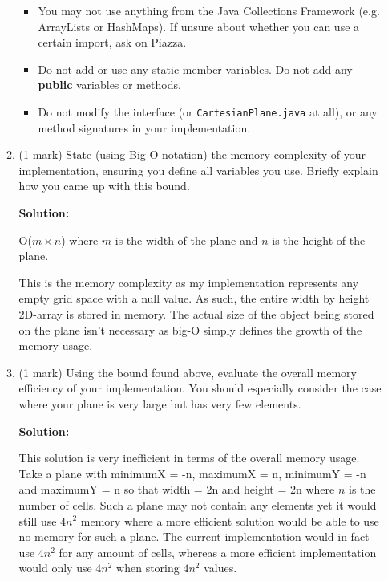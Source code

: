 \documentclass[a4,13pt]{extarticle}
\newenvironment{Solution}{\color{blue}\textbf{Solution:}}{}
\begin{document}
\begin{enumerate}
\begin{enumerate}
\begin{itemize}
	      	      	      	   	                          
	      	      	\item You may not use anything from the Java Collections Framework (e.g. ArrayLists or HashMaps). If unsure about whether you can use a certain import, ask on Piazza.
	      	      	                               
	      	      	\item Do not add or use any static member variables. Do not add any \textbf{public} variables or methods.
	      	      	\item Do not modify the interface (or \texttt{CartesianPlane.java} at all), or any method signatures in your implementation.
	      	      \end{itemize}
	      	      	      	                      
	      	\item (1 mark) State (using Big-O notation) the memory complexity of your implementation, 
	      	      ensuring you define all variables you use. Briefly explain how you came up with this bound.
	      	      
			\begin{Solution}
				
				O($m \times n$) where $m$ is the width of the plane and $n$ is the height of the plane.

				This is the memory complexity as my implementation represents any empty grid space with a null value. As such, the entire width by height 2D-array is stored in memory. The actual size of the object being stored on the plane isn't necessary as big-O simply defines the growth of the memory-usage.
	      	\end{Solution}
	      	      	      	                      
	      	\item (1 mark) Using the bound found above, evaluate the overall memory efficiency of your implementation. 
	      	      You should especially consider the case where your plane is very large but has very few elements.
	      	
			\begin{Solution}

				This solution is very inefficient in terms of the overall memory usage. Take a plane with minimumX = -n, maximumX = n, minimumY = -n and maximumY = n so that width = 2n and height = 2n where $n$ is the number of cells. Such a plane may not contain any elements yet it would still use $4n^2$ memory where a more efficient solution would be able to use no memory for such a plane. The current implementation would in fact use $4n^2$ for any amount of cells, whereas a more efficient implementation would only use $4n^2$ when storing $4n^2$ values.
	      	\end{Solution}
	      	      	      	                      

\end{enumerate}
\end{enumerate}
\end{document}
